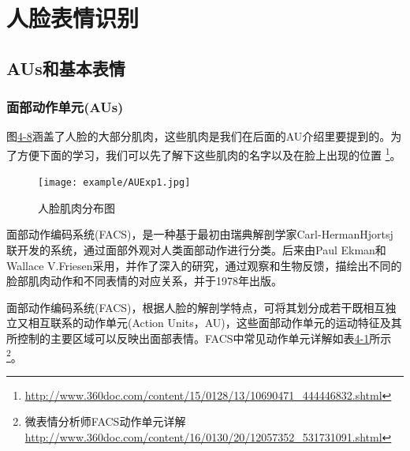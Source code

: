 \section{人脸表情识别}

\subsection{AUs和基本表情}

\subsubsection{面部动作单元(AUs)}

图\href{fig:4-8}{4-8}涵盖了人脸的大部分肌肉，这些肌肉是我们在后面的AU介绍里要提到的。为了方便下面的学习，我们可以先了解下这些肌肉的名字以及在脸上出现的位置 \footnote{\url{http://www.360doc.com/content/15/0128/13/10690471_444446832.shtml}}。

\begin{figure}[!htp]
\centering
\texttt{[image: example/AUExp1.jpg]}
\caption{人脸肌肉分布图}
\label{figure:4-8}
\end{figure}

面部动作编码系统(FACS)，是一种基于最初由瑞典解剖学家Carl-HermanHjortsj联开发的系统，通过面部外观对人类面部动作进行分类。后来由Paul Ekman和Wallace V.Friesen采用，并作了深入的研究，通过观察和生物反馈，描绘出不同的脸部肌肉动作和不同表情的对应关系，并于1978年出版。

面部动作编码系统(FACS)，根据人脸的解剖学特点，可将其划分成若干既相互独立又相互联系的动作单元(Action Units，AU)，这些面部动作单元的运动特征及其所控制的主要区域可以反映出面部表情。FACS中常见动作单元详解如表\href{tab:4-1}{4-1}所示 \footnote{微表情分析师FACS动作单元详解 \quad \url{http://www.360doc.com/content/16/0130/20/12057352_531731091.shtml}}。

